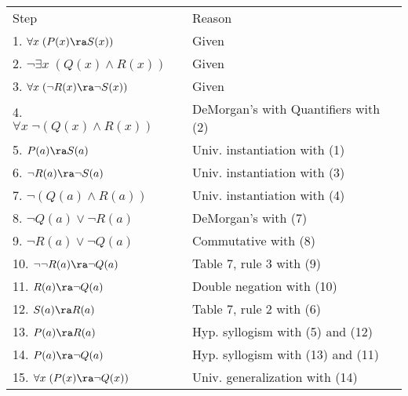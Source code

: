 \begin{questions}
\begin{solution}
    \begin{tabular}{lll}
            Step                    & \hspace{0.15in} & Reason \\
            1. $\forall x\; (P(x) \ra S(x))$            & & Given \\
            2. $\neg \exists x\; (Q(x) \wedge R(x))$    & & Given \\
            3. $\forall x\; (\neg R(x) \ra \neg S(x))$  & & Given \\
            4. $\forall x\; \neg (Q(x) \wedge R(x))$    & & DeMorgan's with Quantifiers with (2) \\
            5. $P(a) \ra S(a)$                          & & Univ. instantiation with (1) \\
            6. $\neg R(a) \ra \neg S(a)$                & & Univ. instantiation with (3) \\
            7. $\neg (Q(a) \wedge R(a))$                & & Univ. instantiation with (4) \\
            8. $\neg Q(a) \vee \neg R(a)$               & & DeMorgan's with (7) \\
            9. $\neg R(a) \vee \neg Q(a)$               & & Commutative with (8) \\
            10. $\neg \neg R(a) \ra \neg Q(a)$          & & Table 7, rule 3 with (9) \\
            11. $R(a) \ra \neg Q(a)$                    & & Double negation with (10) \\
            12. $S(a) \ra R(a)$                         & & Table 7, rule 2 with (6) \\
            13. $P(a) \ra R(a)$                         & & Hyp. syllogism with (5) and (12) \\
            14. $P(a) \ra \neg Q(a)$                    & & Hyp. syllogism with (13) and (11) \\
            15. $\forall x\; (P(x) \ra \neg Q(x))$      & & Univ. generalization with (14)
    \end{tabular}
\end{solution}



\ifprintanswers
\else
{}


\end{questions}
